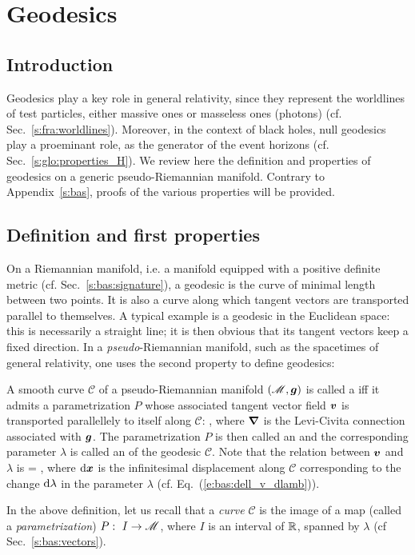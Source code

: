 \chapter{Geodesics} \label{s:geo}

\minitoc

\section{Introduction}

Geodesics play a key role in general relativity, since they represent
the worldlines of test particles, either massive ones or masseless ones (photons)
(cf. Sec.~\ref{s:fra:worldlines}). Moreover, in the context of black holes,
null geodesics play a proeminant role, as the generator of the event horizons
(cf. Sec.~\ref{s:glo:properties_H}). We review here the definition and
properties of geodesics on a generic pseudo-Riemannian manifold.
Contrary to Appendix~\ref{s:bas}, proofs of the various properties will be provided.


\section{Definition and first properties}

On a Riemannian manifold, i.e. a manifold equipped with a positive definite metric
(cf. Sec.~\ref{s:bas:signature}), a geodesic is the curve of minimal length between
two points. It is also a curve along which tangent vectors are transported parallel
to themselves. A typical example is a geodesic in the Euclidean space: this is
necessarily a straight line; it is then obvious that its tangent vectors
keep a fixed direction. In a \emph{pseudo}-Riemannian manifold, such as the
spacetimes of general relativity, one uses
the second property to define geodesics:
\begin{greybox}
A smooth curve $\mathcal{C}$ of a pseudo-Riemannian manifold $(\mathscr{M},\bm{g})$ is
called a  iff it admits a parametrization $P$ whose associated
tangent vector field $\bm{v}$ is transported parallellely to itself along
$\mathcal{C}$:
\be \label{e:geo:geod_eq_v}
    ,
\ee
where $\bm{\nabla}$ is the Levi-Civita connection associated with $\bm{g}$.
The parametrization $P$ is then called an
and the corresponding parameter $\lambda$ is called an
 of the
geodesic $\mathcal{C}$. Note that the relation between $\bm{v}$ and $\lambda$ is
\be \label{e:geo:v_dxdlambda}
     =  ,
\ee
where $\mathrm{d}\bm{x}$ is the infinitesimal displacement along $\mathcal{C}$ corresponding
to the change $\mathrm{d}\lambda$ in the parameter $\lambda$
(cf. Eq.~(\ref{e:bas:dell_v_dlamb})).
\end{greybox}
In the above definition, let us recall that a \emph{curve} $\mathcal{C}$ is the image of a map (called
a \emph{parametrization}) $P:\ I\rightarrow \mathscr{M}$,
where $I$ is an interval of $\mathbb{R}$, spanned by $\lambda$ (cf Sec.~\ref{s:bas:vectors}).

